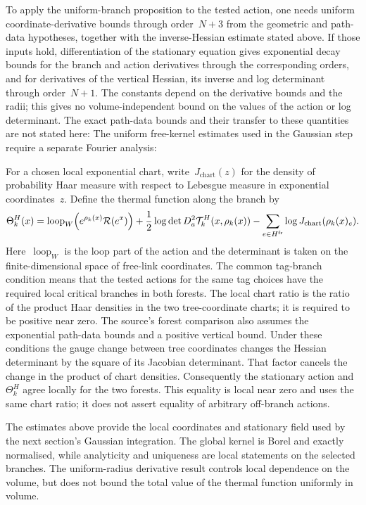 To apply the uniform-branch proposition to the tested action, one needs uniform coordinate-derivative bounds through order~$N+3$ from the geometric and path-data hypotheses, together with the inverse-Hessian estimate stated above. If those inputs hold, differentiation of the stationary equation gives exponential decay bounds for the branch and action derivatives through the corresponding orders, and for derivatives of the vertical Hessian, its inverse and log determinant through order~$N+1$. The constants depend on the derivative bounds and the radii; this gives no volume-independent bound on the values of the action or log determinant. The exact path-data bounds and their transfer to these quantities are not stated here:
The uniform free-kernel estimates used in the Gaussian step require a separate Fourier analysis:

For a chosen local exponential chart, write~$J_{\mathrm{chart}}(z)$ for the density of probability Haar measure with respect to Lebesgue measure in exponential coordinates~$z$. Define the thermal function along the branch by
\begin{equation}\label{eq:uv-thermal-function}
 \Theta^H_k(x)=
 \operatorname{loop}_W\!\left(e^{\rho_k(x)}\mathcal R(e^x)\right)
 +\frac12\log\det D_a^2\mathcal T^H_k(x,\rho_k(x))
 -\sum_{e\in H^{\rm fr}}\log J_{\mathrm{chart}}(\rho_k(x)_e).
\end{equation}
Here~$\operatorname{loop}_W$ is the loop part of the action and the determinant is taken on the finite-dimensional space of free-link coordinates. The common tag-branch condition means that the tested actions for the same tag choices have the required local critical branches in both forests. The local chart ratio is the ratio of the product Haar densities in the two tree-coordinate charts; it is required to be positive near zero. The source's forest comparison also assumes the exponential path-data bounds and a positive vertical bound. Under these conditions the gauge change between tree coordinates changes the Hessian determinant by the square of its Jacobian determinant. That factor cancels the change in the product of chart densities. Consequently the stationary action and~$\Theta^H_k$ agree locally for the two forests. This equality is local near zero and uses the same chart ratio; it does not assert equality of arbitrary off-branch actions.

The estimates above provide the local coordinates and stationary field used by the next section's Gaussian integration. The global kernel is Borel and exactly normalised, while analyticity and uniqueness are local statements on the selected branches. The uniform-radius derivative result controls local dependence on the volume, but does not bound the total value of the thermal function uniformly in volume.
